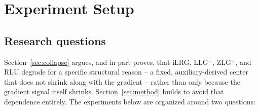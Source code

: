 
\section{Experiment Setup}
\label{sec:eval}

\subsection{Research questions}
\label{sec:eval-rq}

Section~\ref{sec:collapse} argues, and in part proves, that iLRG,
LLG\(^+\), ZLG\(^+\), and RLU degrade for a specific structural reason --
a fixed, auxiliary-derived center that does not shrink along with the
gradient -- rather than only because the gradient signal itself shrinks.
Section~\ref{sec:method} builds \ourmethod{} to avoid that dependence
entirely. The experiments below are organized around two questions:

